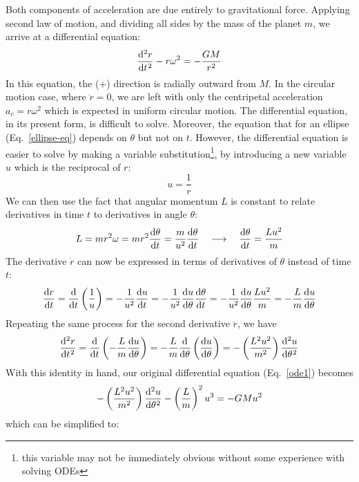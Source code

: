Both components of acceleration are due entirely to gravitational force.
Applying second law of motion, and dividing all sides by the mass of the planet
$m$, we arrive at a differential equation:
\begin{equation}
  \diff[2]rt-r\omega^2=-\frac{GM}{r^2}
  \label{ode1}
\end{equation}
In this equation, the ($+$) direction is radially outward from $M$. In the
circular motion case, where $\ddot r=0$, we are left with only the centripetal
acceleration $a_c=r\omega^2$ which is expected in uniform circular motion. The
differential equation, in its present form, is difficult to solve. Moreover,
the equation that for an ellipse (Eq.~\ref{ellipse-eq}) depends on $\theta$ but
not on $t$. However, the differential equation is easier to solve by making a
variable substitution\footnote{this variable may not be immediately obvious
  without some experience with solving ODEs}, by introducing a new variable $u$
which is the reciprocal of $r$:
\begin{equation}
  u=\frac1r
\end{equation}
We can then use the fact that angular momentum $L$ is constant to relate
derivatives in time $t$ to derivatives in angle $\theta$:
\begin{equation}
  L=mr^2\omega=mr^2\diff{\theta}t=\frac m{u^2}\diff{\theta}t
  \quad\longrightarrow\quad
  \diff{\theta}t=\frac{Lu^2}m
\end{equation}
The derivative $\dot r$ can now be expressed in terms of derivatives of
$\theta$ instead of time $t$:
\begin{equation}
  \diff rt =\diff*{\left(\frac1u\right)}t
  =-\frac1{u^2}\diff ut=-\frac1{u^2}\diff u\theta\diff{\theta}t
  = -\frac1{u^2}\diff u\theta \frac{Lu^2}m
  = -\frac Lm\diff u\theta
\end{equation}
Repeating the same process for the second derivative $\ddot r$, we have
\begin{equation}
  \diff[2] rt = \diff*{\left(-\frac Lm\diff u\theta\right)}t
  = -\frac Lm\diff*{\left(\diff u\theta\right)}\theta \\
  = -\left(\frac{L^2u^2}{m^2}\right)\diff[2]u\theta
\end{equation}
With this identity in hand, our original differential equation
(Eq.~\ref{ode1}) becomes
\begin{equation}
  -\left(\frac{L^2u^2}{m^2}\right)\diff[2]u\theta-\left(\frac Lm\right)^2u^3
  = -GMu^2
\end{equation}
which can be simplified to:
